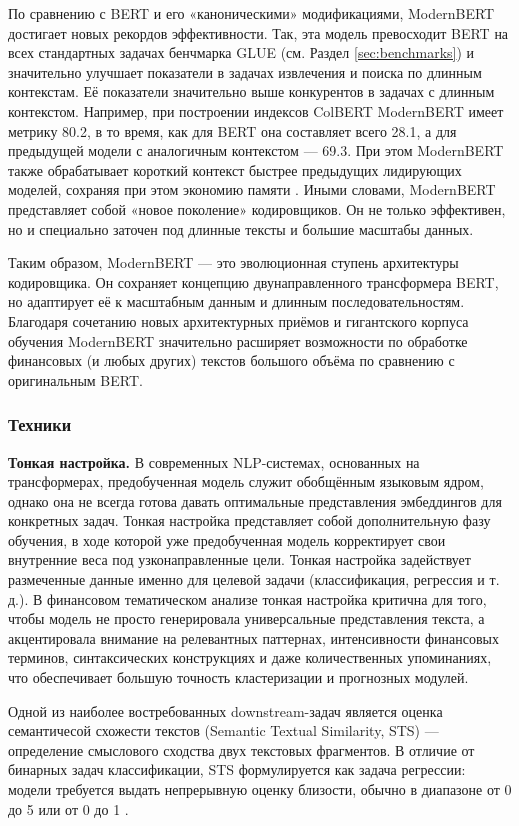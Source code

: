 По сравнению с BERT и его «каноническими» модификациями, ModernBERT достигает новых рекордов эффективности. Так,
эта модель превосходит BERT на всех стандартных задачах бенчмарка GLUE (см. Раздел \ref{sec:benchmarks}) и значительно
улучшает показатели в задачах извлечения и поиска по длинным контекстам. Её показатели значительно выше конкурентов
в задачах с длинным контекстом. Например, при построении индексов ColBERT ModernBERT имеет метрику 80.2, в то время,
как для BERT она составляет всего 28.1, а для предыдущей модели с аналогичным контекстом --- 69.3. При этом ModernBERT
также обрабатывает короткий контекст быстрее предыдущих лидирующих моделей, сохраняя при этом экономию памяти
\parencite{Warner2024ModernBERT, devlin2019BERT}. Иными словами, ModernBERT представляет собой «новое поколение»
кодировщиков. Он не только эффективен, но и специально заточен под длинные тексты и большие масштабы данных.

Таким образом, ModernBERT — это эволюционная ступень архитектуры кодировщика. Он сохраняет концепцию двунаправленного
трансформера BERT, но адаптирует её к масштабным данным и длинным последовательностям. Благодаря сочетанию новых
архитектурных приёмов и гигантского корпуса обучения ModernBERT значительно расширяет возможности по обработке финансовых
(и любых других) текстов большого объёма по сравнению с оригинальным BERT.

\subsubsection{Техники}
\textbf{Тонкая настройка.} В современных NLP-системах, основанных на трансформерах, предобученная модель служит
обобщённым языковым ядром, однако она не всегда готова давать оптимальные представления эмбеддингов для конкретных
задач. Тонкая настройка представляет собой дополнительную фазу обучения, в ходе которой уже предобученная модель
корректирует свои внутренние веса под узконаправленные цели. Тонкая настройка задействует размеченные данные
именно для целевой задачи (классификация, регрессия и т. д.). В финансовом тематическом анализе тонкая настройка
критична для того, чтобы модель не просто генерировала универсальные представления текста, а акцентировала внимание
на релевантных паттернах, интенсивности финансовых терминов, синтаксических конструкциях и даже количественных
упоминаниях, что обеспечивает большую точность кластеризации и прогнозных модулей.

Одной из наиболее востребованных downstream-задач является оценка семантичесой схожести текстов (Semantic Textual
Similarity, STS) --- определение смыслового сходства двух текстовых фрагментов. В отличие от бинарных задач классификации,
STS формулируется как задача регрессии: модели требуется выдать непрерывную оценку близости, обычно в диапазоне
от 0 до 5 \parencite{Cer2017STSB} или от 0 до 1 \parencite{gao2021simcse}.

